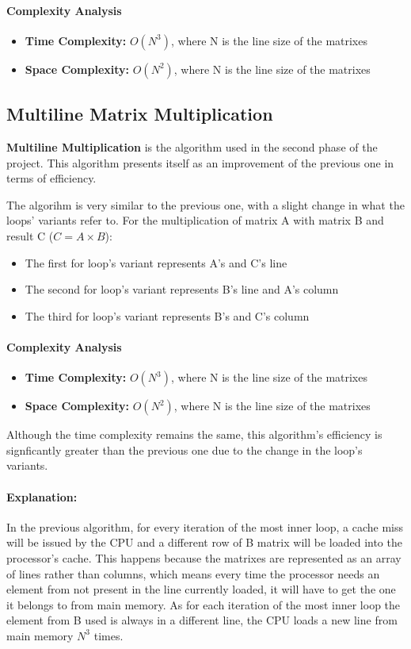 \paragraph{Complexity Analysis}
\begin{itemize}
    \item \textbf{Time Complexity:} $O(N^3)$, where N is the line size of the matrixes
    \item \textbf{Space Complexity:} $O(N^2)$, where N is the line size of the matrixes
\end{itemize}

\subsection{Multiline Matrix Multiplication}
\textbf{Multiline Multiplication} is the algorithm used in the second phase of the project. This algorithm presents itself as an improvement of the previous one in terms of efficiency.

The algorihm is very similar to the previous one, with a slight change in what the loops' variants refer to. For the multiplication of matrix A with matrix B and result C ($C = A \times B$):

\begin{itemize}
    \item The first for loop's variant represents A's and C's line
    \item The second for loop's variant represents B's line and A's column
    \item The third for loop's variant represents B's and C's column
\end{itemize}

\paragraph{Complexity Analysis}
\begin{itemize}
    \item \textbf{Time Complexity:} $O(N^3)$, where N is the line size of the matrixes
    \item \textbf{Space Complexity:} $O(N^2)$, where N is the line size of the matrixes
\end{itemize}

Although the time complexity remains the same, this algorithm's efficiency is signficantly greater than the previous one due to the change in the loop's variants. 

\paragraph{Explanation:} In the previous algorithm, for every iteration of the most inner loop, a cache miss will be issued by the CPU and a different row of B matrix will be loaded into the processor's cache. This happens because the matrixes are represented as an array of lines rather than columns, which means every time the processor needs an element from not present in the line currently loaded, it will have to get the one it belongs to from main memory. As for each iteration of the most inner loop the element from B used is always in a different line, the CPU loads a new line from main memory $N^3$ times.

